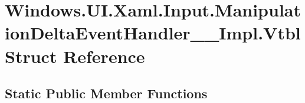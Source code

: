 \hypertarget{struct_windows_1_1_u_i_1_1_xaml_1_1_input_1_1_manipulation_delta_event_handler_____impl_1_1_vtbl}{}\section{Windows.\+U\+I.\+Xaml.\+Input.\+Manipulation\+Delta\+Event\+Handler\+\_\+\+\_\+\+Impl.\+Vtbl Struct Reference}
\label{struct_windows_1_1_u_i_1_1_xaml_1_1_input_1_1_manipulation_delta_event_handler_____impl_1_1_vtbl}
\subsection*{Static Public Member Functions}
